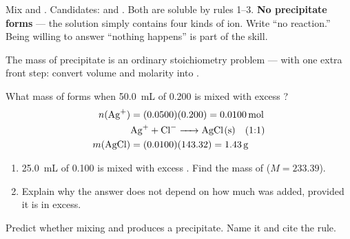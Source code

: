 \documentclass{apchem-notes}
\begin{document}
\begin{workedexample}
Mix  and . Candidates:  and .
Both are soluble by rules 1--3. \textbf{No precipitate forms} --- the
solution simply contains four kinds of ion. Write ``no reaction.'' Being
willing to answer ``nothing happens'' is part of the skill.
\end{workedexample}


The mass of precipitate is an ordinary stoichiometry problem --- with one
extra front step: convert volume and molarity into
.

\begin{workedexample}
What mass of  forms when \SI{50.0}{\milli\liter} of
\SI{0.200}{\Molar}  is mixed with excess ?
\begin{align*}
  n(\ce{Ag+}) &= (0.0500)(0.200) = \SI{0.0100}{\mole}\\
  &\ce{Ag+ + Cl- -> AgCl(s)} \quad (1{:}1)\\
  m(\ce{AgCl}) &= (0.0100)(143.32) = \SI{1.43}{\gram}
\end{align*}
\end{workedexample}

\begin{enumerate}[leftmargin=*,itemsep=0.4em]
  \item \SI{25.0}{\milli\liter} of \SI{0.100}{\Molar}  is mixed
        with excess . Find the mass of 
        ($M = 233.39$). \workspace[2.4cm]
  \item Explain why the answer does not depend on how much  was
        added, provided it is in excess. 
\end{enumerate}

\begin{exitticket}
Predict whether mixing  and  produces a
precipitate. Name it and cite the rule.
\end{exitticket}
\end{document}
